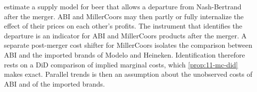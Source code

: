 \begin{remark}\label{rem:A-did-structural}
\citet[pp.~1779--1780]{MillerWeinberg2017} estimate a supply model for beer that allows a departure from Nash-Bertrand
after the merger. ABI and MillerCoors may then partly or fully internalize the effect of their prices on each other's
profits. The instrument that identifies the departure is an indicator for ABI and MillerCoors products after the
merger. A separate post-merger cost shifter for MillerCoors isolates the comparison between ABI and the imported brands of Modelo and Heineken.
Identification therefore rests on a DiD comparison of implied marginal costs, which \cref{prop:11-mc-did} makes
exact. Parallel trends is then an assumption about the unobserved costs of ABI and of the imported brands.
\end{remark}

